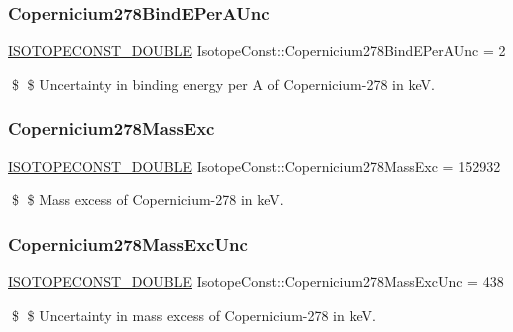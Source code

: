 \subsubsection{\texorpdfstring{Copernicium278\+Bind\+E\+Per\+A\+Unc}{Copernicium278BindEPerAUnc}}
{\footnotesize\ttfamily \mbox{\hyperlink{group___isotope_const-_macros_ga8f45a7272ce02c0b4c65c44636ed719a}{I\+S\+O\+T\+O\+P\+E\+C\+O\+N\+S\+T\+\_\+\+D\+O\+U\+B\+LE}} Isotope\+Const\+::\+Copernicium278\+Bind\+E\+Per\+A\+Unc = 2}

\$ \$ Uncertainty in binding energy per A of Copernicium-\/278 in keV. \mbox{\label{group___isotope_const-_copernicium-_cn278_gae4b37cdc420efaebe37d6c67a0efd6b4}} 
\subsubsection{\texorpdfstring{Copernicium278\+Mass\+Exc}{Copernicium278MassExc}}
{\footnotesize\ttfamily \mbox{\hyperlink{group___isotope_const-_macros_ga8f45a7272ce02c0b4c65c44636ed719a}{I\+S\+O\+T\+O\+P\+E\+C\+O\+N\+S\+T\+\_\+\+D\+O\+U\+B\+LE}} Isotope\+Const\+::\+Copernicium278\+Mass\+Exc = 152932}

\$ \$ Mass excess of Copernicium-\/278 in keV. \mbox{\label{group___isotope_const-_copernicium-_cn278_ga67dc320ffe5497a3af91acc557bea739}} 
\subsubsection{\texorpdfstring{Copernicium278\+Mass\+Exc\+Unc}{Copernicium278MassExcUnc}}
{\footnotesize\ttfamily \mbox{\hyperlink{group___isotope_const-_macros_ga8f45a7272ce02c0b4c65c44636ed719a}{I\+S\+O\+T\+O\+P\+E\+C\+O\+N\+S\+T\+\_\+\+D\+O\+U\+B\+LE}} Isotope\+Const\+::\+Copernicium278\+Mass\+Exc\+Unc = 438}

\$ \$ Uncertainty in mass excess of Copernicium-\/278 in keV. \mbox{\label{group___isotope_const-_copernicium-_cn278_ga4d3ea929056efd254f6fed70c3927b9b}} 
